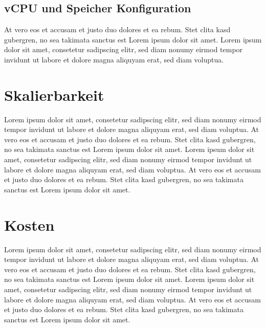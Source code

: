 \subsection{vCPU und Speicher Konfiguration}
At vero eos et accusam et justo duo dolores et ea rebum. Stet clita kasd gubergren,
no sea takimata sanctus est Lorem ipsum dolor sit amet. Lorem ipsum dolor sit amet,
consetetur sadipscing elitr, sed diam nonumy eirmod tempor invidunt ut labore et
dolore magna aliquyam erat, sed diam voluptua.

\section{Skalierbarkeit}
Lorem ipsum dolor sit amet, consetetur sadipscing elitr,
sed diam nonumy eirmod tempor invidunt ut labore et dolore magna
aliquyam erat, sed diam voluptua.
At vero eos et accusam et justo duo dolores et ea rebum. Stet clita kasd gubergren,
no sea takimata sanctus est Lorem ipsum dolor sit amet. Lorem ipsum dolor sit amet,
consetetur sadipscing elitr, sed diam nonumy eirmod tempor invidunt ut labore et
dolore magna aliquyam erat, sed diam voluptua.
At vero eos et accusam et justo duo dolores et ea rebum.
Stet clita kasd gubergren, no sea takimata sanctus est Lorem ipsum dolor sit amet.

\section{Kosten}
Lorem ipsum dolor sit amet, consetetur sadipscing elitr,
sed diam nonumy eirmod tempor invidunt ut labore et dolore magna
aliquyam erat, sed diam voluptua.
At vero eos et accusam et justo duo dolores et ea rebum. Stet clita kasd gubergren,
no sea takimata sanctus est Lorem ipsum dolor sit amet. Lorem ipsum dolor sit amet,
consetetur sadipscing elitr, sed diam nonumy eirmod tempor invidunt ut labore et
dolore magna aliquyam erat, sed diam voluptua.
At vero eos et accusam et justo duo dolores et ea rebum.
Stet clita kasd gubergren, no sea takimata sanctus est Lorem ipsum dolor sit amet.